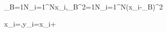 \mu_B=\frac1N\sum_{i=1}^Nx_i,\quad\sigma_B^2=\frac1N\sum_{i=1}^N(x_i-\mu_B)^2

\widehat x_i=,\qquad y_i=\gamma\widehat x_i+\beta
